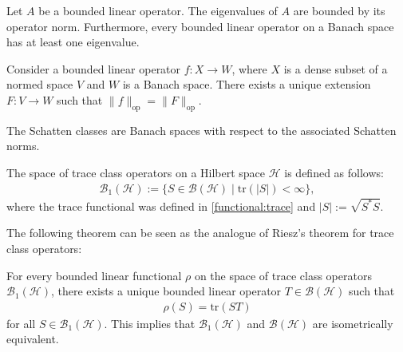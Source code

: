     \begin{property}
        Let $A$ be a bounded linear operator. The eigenvalues of $A$ are bounded by its operator norm. Furthermore, every bounded linear operator on a Banach space has at least one eigenvalue.
    \end{property}

    \begin{property}
        Consider a bounded linear operator $f:X\rightarrow W$, where $X$ is a dense subset of a normed space $V$ and $W$ is a Banach space. There exists a unique extension $F:V\rightarrow W$ such that $\|f\|_\mathrm{op} = \|F\|_\mathrm{op}$.
    \end{property}

    \begin{property}
        The Schatten classes are Banach spaces with respect to the associated Schatten norms.
    \end{property}

    \begin{example}
        The space of trace class operators on a Hilbert space $\mathcal{H}$ is defined as follows:
        \begin{gather}
            \mathcal{B}_1(\mathcal{H}) := \{S\in\mathcal{B}(\mathcal{H})\mid\mathrm{tr}(|S|)<\infty\},
        \end{gather}
        where the trace functional was defined in \ref{functional:trace} and $|S|:=\sqrt{S^*S}$.
    \end{example}
    The following theorem can be seen as the analogue of Riesz's theorem for trace class operators:
    \begin{theorem}
        For every bounded linear functional $\rho$ on the space of trace class operators $\mathcal{B}_1(\mathcal{H})$, there exists a unique bounded linear operator $T\in\mathcal{B}(\mathcal{H})$ such that
        \begin{gather}
            \rho(S) = \mathrm{tr}(ST)
        \end{gather}
        for all $S\in\mathcal{B}_1(\mathcal{H})$. This implies that $\mathcal{B}_1(\mathcal{H})$ and $\mathcal{B}(\mathcal{H})$ are isometrically equivalent.
    \end{theorem}

